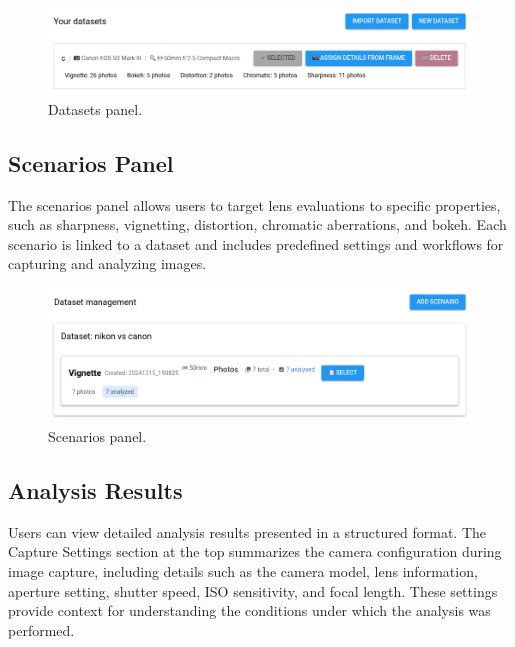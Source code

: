 \begin{figure}[h]
\centering
\includegraphics[width=1\textwidth]{Images/datasets_panel.png}
\caption{Datasets panel.}
\label{fig:ui_datasets}
\end{figure}

\subsection{Scenarios Panel}

The scenarios panel allows users to target lens evaluations to specific properties, such as sharpness, vignetting, distortion, chromatic aberrations, and bokeh. Each scenario is linked to a dataset and includes predefined settings and workflows for capturing and analyzing images.

\begin{figure}[hbt]
\centering
\includegraphics[width=1\textwidth]{Images/scenarios_panel.png}
\caption{Scenarios panel.}
\label{fig:ui_scenarios}
\end{figure}

\subsection{Analysis Results}

Users can view detailed analysis results presented in a structured format. The Capture Settings section at the top summarizes the camera configuration during image capture, including details such as the camera model, lens information, aperture setting, shutter speed, ISO sensitivity, and focal length. These settings provide context for understanding the conditions under which the analysis was performed.

